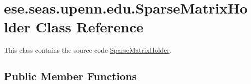 \hypertarget{classese_1_1seas_1_1upenn_1_1edu_1_1_sparse_matrix_holder}{}\section{ese.\+seas.\+upenn.\+edu.\+Sparse\+Matrix\+Holder Class Reference}
\label{classese_1_1seas_1_1upenn_1_1edu_1_1_sparse_matrix_holder}


This class contains the source code \hyperlink{classese_1_1seas_1_1upenn_1_1edu_1_1_sparse_matrix_holder}{Sparse\+Matrix\+Holder}.  


\subsection*{Public Member Functions}
